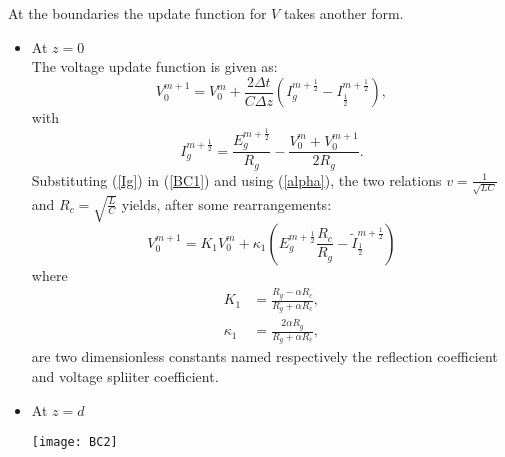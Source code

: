 At the boundaries the update function for $V$ takes another form.
\begin{itemize}
    \item At $z = 0$\\
    The voltage update function is given as:
    \begin{equation}
        V^{m+1}_{0} = V^{m}_{0} + \frac{2\Delta t}{C\Delta z}\left(I^{m+\frac{1}{2}}_{g} - I^{m+\frac{1}{2}}_{\frac{1}{2}}\right),
        \label{BC1}
    \end{equation}
    with 
    \begin{equation}
        I^{m+\frac{1}{2}}_{g} = \frac{E^{m+\frac{1}{2}}_{g}}{R_{g}}-\frac{V^{m}_{0}+V^{m+1}_{0}}{2R_g}.
        \label{Ig}
    \end{equation}
    Substituting (\ref{Ig}) in (\ref{BC1}) and using (\ref{alpha}), the two relations $v=\frac{1}{\sqrt{LC}}$ and $R_c=\sqrt{\frac{L}{C}}$ yields, 
    after some rearrangements:
    \begin{equation}
        V^{m+1}_{0} = K_{1}V^{m}_{0} + \kappa_{1}\left(E^{m+\frac{1}{2}}_{g}\frac{R_c}{R_{g}} - \tilde{I}^{m+\frac{1}{2}}_{\frac{1}{2}}\right)
    \end{equation}
    where
    \begin{align}
        K_{1} & = \frac{R_{g}-\alpha R_{c}}{R_{g}+\alpha R_{c}},\\
        \kappa_{1} & = \frac{2\alpha R_{g}}{R_{g}+\alpha R_{c}},
    \end{align}
    are two dimensionless constants named respectively the reflection coefficient and voltage spliiter coefficient.
    \item At $z = d$\\
    
    \begin{center}
    \texttt{[image: BC2]}
    \end{center}


\end{itemize}
